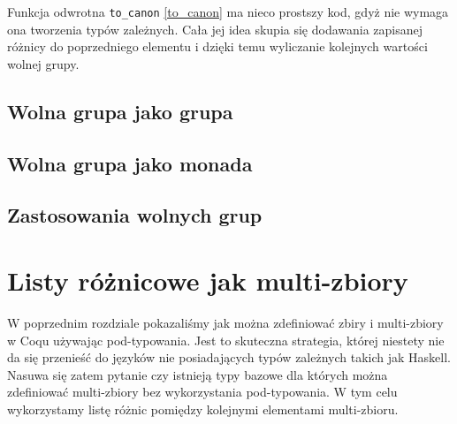 Funkcja odwrotna \texttt{to_canon} \ref{to_canon} ma nieco prostszy kod, gdyż nie wymaga ona tworzenia typów zależnych. Cała jej idea skupia się dodawania zapisanej różnicy do poprzedniego elementu i dzięki temu wyliczanie kolejnych wartości wolnej grupy.
\subsection{Wolna grupa jako grupa}

\subsection{Wolna grupa jako monada}
\subsection{Zastosowania wolnych grup}
\section{Listy różnicowe jak multi-zbiory}
W poprzednim rozdziale pokazaliśmy jak można zdefiniować zbiry i multi-zbiory w Coqu używając pod-typowania. Jest to skuteczna strategia, której niestety nie da się przenieść do języków nie posiadających typów zależnych takich jak Haskell. Nasuwa się zatem pytanie czy istnieją typy bazowe dla których można zdefiniować multi-zbiory bez wykorzystania pod-typowania. W tym celu wykorzystamy listę różnic pomiędzy kolejnymi elementami multi-zbioru.

